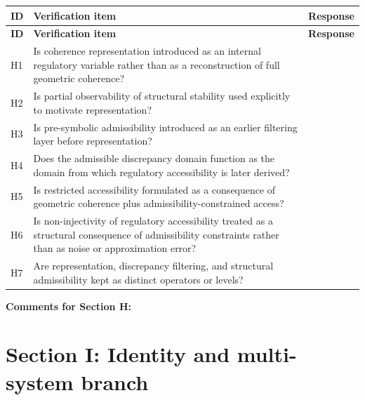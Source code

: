 \documentclass[11pt,a4paper]{article}
\begin{document}
	\begin{longtable}{>{\RaggedRight\arraybackslash}p{}
			>{\RaggedRight\arraybackslash}p{}
			>{\RaggedRight\arraybackslash}p{}}
		\toprule
		\textbf{ID} & \textbf{Verification item} & \textbf{Response} \\
		\midrule
		\endfirsthead
		\toprule
		\textbf{ID} & \textbf{Verification item} & \textbf{Response} \\
		\midrule
		\endhead
		
		H1 & Is coherence representation introduced as an internal regulatory variable rather than as a reconstruction of full geometric coherence? & \\
		
		H2 & Is partial observability of structural stability used explicitly to motivate representation? & \\
		
		H3 & Is pre-symbolic admissibility introduced as an earlier filtering layer before representation? & \\
		
		H4 & Does the admissible discrepancy domain function as the domain from which regulatory accessibility is later derived? & \\
		
		H5 & Is restricted accessibility formulated as a consequence of geometric coherence plus admissibility-constrained access? & \\
		
		H6 & Is non-injectivity of regulatory accessibility treated as a structural consequence of admissibility constraints rather than as noise or approximation error? & \\
		
		H7 & Are representation, discrepancy filtering, and structural admissibility kept as distinct operators or levels? & \\
		
		\bottomrule
	\end{longtable}
	
	\textbf{Comments for Section H:}
	
	\vspace{3em}
	
	\section{Section I: Identity and multi-system branch}
	
\end{document}
